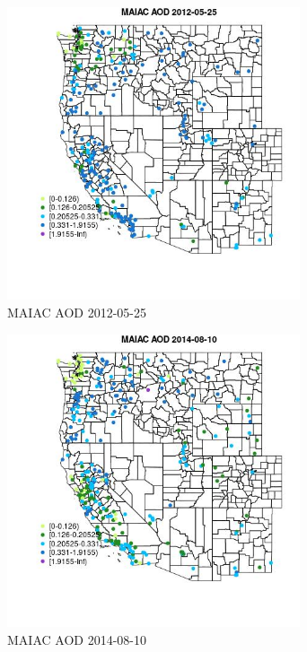 \begin{figure} 
\centering  
\includegraphics[width=0.77\textwidth]{Code_Outputs/Report_ML_input_PM25_Step4_part_e_de_duplicated_aves_compiled_2019-05-18wNAs_MapObsMAIAC_AOD2012-05-25.jpg} 
\caption{\label{fig:Report_ML_input_PM25_Step4_part_e_de_duplicated_aves_compiled_2019-05-18wNAsMapObsMAIAC_AOD2012-05-25}MAIAC AOD 2012-05-25} 
\end{figure} 
 

\clearpage 

\begin{figure} 
\centering  
\includegraphics[width=0.77\textwidth]{Code_Outputs/Report_ML_input_PM25_Step4_part_e_de_duplicated_aves_compiled_2019-05-18wNAs_MapObsMAIAC_AOD2014-08-10.jpg} 
\caption{\label{fig:Report_ML_input_PM25_Step4_part_e_de_duplicated_aves_compiled_2019-05-18wNAsMapObsMAIAC_AOD2014-08-10}MAIAC AOD 2014-08-10} 
\end{figure} 
 

